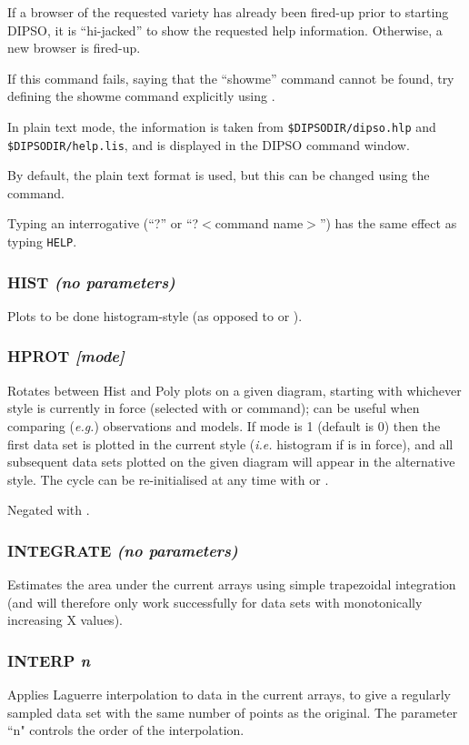\documentclass[twoside,11pt,noabs,nolof]{starlink}
\providecommand{\dipcom}[3]{\subsubsection*{\label{COM:#1}\xlabel{COM:#1}\textbf{#1} \emph{#2}}}
\begin{document}
\begin{terminalv}
\end{terminalv}

If a browser of the requested variety has already been fired-up prior to
starting DIPSO, it is ``hi-jacked'' to show the requested help
information. Otherwise, a new browser is fired-up.

If this command fails, saying that the ``showme'' command cannot be found,
try defining the showme command explicitly using
.

In plain text mode, the information is taken from
{\texttt{\$DIPSODIR/dipso.hlp}} and {\texttt{\$DIPSODIR/help.lis}}, and is
displayed in the DIPSO command window.

By default, the plain text format is used, but this can be changed using the
 command.

Typing an interrogative (``?'' or ``?$<$command name$>$'') has the same effect
as typing {\texttt{HELP}}.

\dipcom{HIST}{(no parameters)}{Causes plots to be done in histogram-style}
Plots to be done histogram-style (as opposed to   or ).


\dipcom{HPROT}{[mode]}{Rotates between {\texttt{HIST}} and {\texttt{POLY}} plots on a given diagram}
Rotates between Hist and Poly plots on a given diagram, starting with
whichever style is currently in force (selected with   or 
command); can be useful when comparing (\emph{e.g.}) observations and
models. If mode is 1 (default is 0) then the first data set is plotted
in the current style (\emph{i.e.} histogram if   is in force), and
all subsequent data sets plotted on the given diagram will appear in
the alternative style. The cycle can be re-initialised at any time
with   or .

Negated with .

\dipcom{INTEGRATE}{(no parameters)}{Estimates the area under the current arrays}
Estimates the area under the current arrays using simple trapezoidal
integration (and will therefore only work successfully for data sets
with monotonically increasing X values).

\dipcom{INTERP}{n}{Re-grid current arrays onto a regular grid}
Applies Laguerre interpolation to data in the current arrays, to give
a regularly sampled data set with the same number of points as the
original. The parameter ``n" controls the order of the interpolation.
\end{document}
